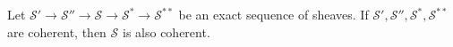 Let $\mathcal{S}' \to \mathcal{S}'' \to \mathcal{S} \to \mathcal{S}^* \to \mathcal{S}^{**}$ be an exact sequence of sheaves. If $\mathcal{S}', \mathcal{S}'', \mathcal{S}^*, \mathcal{S}^{**}$ are coherent, then $\mathcal{S}$ is also coherent.
